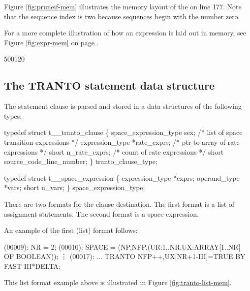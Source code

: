 Figure \ref{fig:pruneif-mem} illustrates the memory layout
of the  on line 177.
Note that the sequence index is two because sequences begin with
the number zero.

For a more complete illustration of how an expression is laid out in
memory, see Figure \ref{fig:expr-mem} on page \pageref{fig:expr-mem}.

\startfig
\begin{fast_picture}{500}{120}
\savFboxpos
{}
      \stackBbox
      \nextBbox{}
      \nextBbox{}
      \nextBbox{}
\nextFbox{}
\end{fast_picture}

\subsection{The TRANTO statement data structure}
\label{sec:tranto}

The  statement clause is parsed
and stored in a data structures of the following types:
\begin{codeexample}
typedef struct t__tranto_clause
   \{
       space_expression_type sex;   /* list of space transition expressions */
       expression_type *rate_exprs; /* ptr to array of rate expressions */
       short n_rate_exprs;          /* count of rate expressions */
       short source_code_line_number;
   \} tranto_clause_type;
\end{codeexample}

\begin{codeexample}
typedef struct t__space_expression
   \{
       expression_type *exprs;
       operand_type *vars;
       short n_vars;
   \} space_expression_type;
\end{codeexample}


There are two formats for the  clause destination.   The first format
is a list of assignment statements.   The second format is a space expression.

An example of the first (list) format follows:
\begin{logfileexample}
(00009): NR = 2;
(00010): SPACE = (NP,NFP,(UR:1..NR,UX:ARRAY[1..NR] OF BOOLEAN));
         \vdots
(00017):  ...  TRANTO NFP++,UX[NR+1-III]=TRUE BY FAST III*DELTA;
\end{logfileexample}
This list format example above is
illustrated in Figure \ref{fig:tranto-list-mem}.

